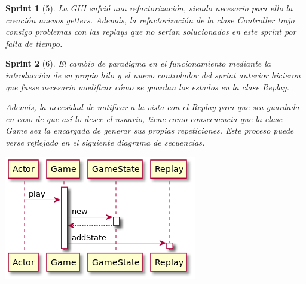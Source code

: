 \documentclass{article}
\theoremstyle{break}
\newtheorem*{sprint}{Sprint}
\begin{document}
\begin{sprint}[5]
La GUI sufrió una refactorización, siendo necesario para ello la creación nuevos getters. Además, la refactorización  de la clase \textit{Controller} trajo consigo problemas con las \textit{replays} que no serían solucionados en este sprint por falta de tiempo.
\end{sprint}

\begin{sprint}[6]
El cambio de paradigma en el funcionamiento mediante la introducción de su propio hilo y el nuevo controlador del sprint anterior hicieron que fuese necesario modificar cómo se guardan los estados en la clase \textit{Replay}.

Además, la necesidad de notificar a la vista con el Replay para que sea guardada en caso de que así lo desee el usuario, tiene como consecuencia que la clase \textit{Game} sea la encargada de generar sus propias repeticiones. Este proceso puede verse reflejado en el siguiente diagrama de secuencias.
\begin{center}
\includegraphics[scale=0.5]{addState-replay-sprint-6.png}
\end{center}


\end{sprint}
\end{document}
